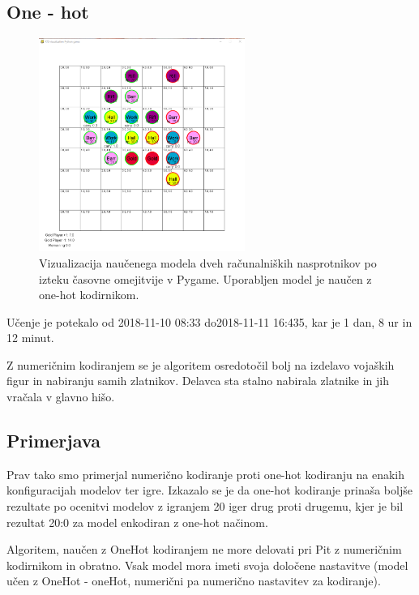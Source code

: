 \documentclass[a4paper, 12pt]{book}
\begin{document}
\subsection{One - hot}

\begin{figure}[h]
	\begin{center}
		\includegraphics[width=0.6\textwidth]{first-onehot.pdf}
	\end{center}
	\caption{Vizualizacija naučenega modela dveh računalniških nasprotnikov po izteku časovne omejitvije v Pygame. Uporabljen model je naučen z one-hot kodirnikom.}
	\label{vizualizacijaRezultatovOneHotKodirnik100Timeout}
\end{figure}


Učenje je potekalo od 2018-11-10 08:33 do2018-11-11 16:435, kar je 1 dan, 8 ur in 12 minut.

Z numeričnim kodiranjem se je algoritem osredotočil bolj na izdelavo vojaških figur in nabiranju samih zlatnikov.
Delavca sta stalno nabirala zlatnike in jih vračala v glavno hišo.

\subsection{Primerjava}

Prav tako smo primerjal numerično kodiranje proti one-hot kodiranju na enakih konfiguracijah modelov ter igre.
Izkazalo se je da one-hot kodiranje prinaša boljše rezultate po ocenitvi modelov z igranjem 20 iger drug proti drugemu, kjer je bil rezultat 20:0 za model enkodiran z one-hot načinom.


Algoritem, naučen z OneHot kodiranjem ne more delovati pri Pit z numeričnim kodirnikom in obratno. 
Vsak model mora imeti svoja določene nastavitve (model učen z OneHot - oneHot, numerični pa numerično nastavitev za kodiranje).
\end{document}
